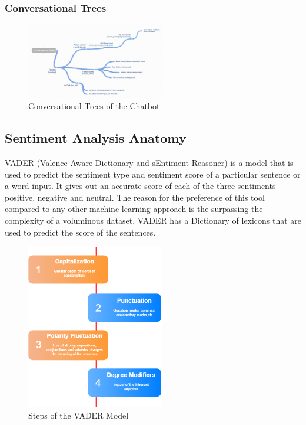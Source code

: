 \documentclass[conference,compsoc]{IEEEtran}
\begin{document}
\subsubsection{Conversational Trees}

\begin{figure}[H]
    \centering
    \includegraphics[width=6cm]{images/conversational-trees.png}
    \caption{Conversational Trees of the Chatbot}
    \label{fig:conversational-trees}
\end{figure}

\subsection{Sentiment Analysis Anatomy}

VADER (Valence Aware Dictionary and sEntiment Reasoner) is a model that is used to predict the sentiment type and sentiment score of a particular sentence or a word input. It gives out an accurate score of each of the three sentiments - positive, negative and neutral. The reason for the preference of this tool compared to any other machine learning approach is the surpassing the complexity of a voluminous dataset. VADER has a Dictionary of lexicons that are used to predict the score of the sentences.

\begin{figure}[H]
    \centering
    \includegraphics[width=6cm]{images/vader-model.png}
    \caption{Steps of the VADER Model}
    \label{fig:vader-model}
\end{figure}
\end{document}
